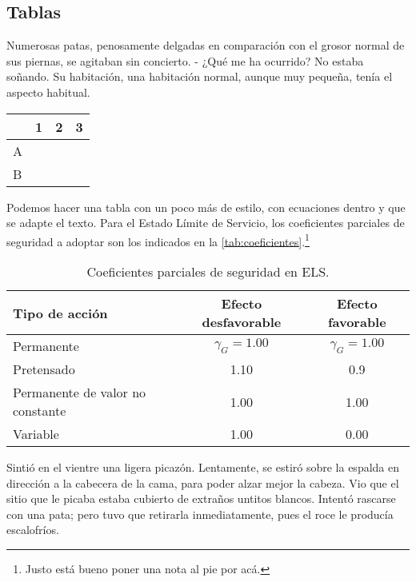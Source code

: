 \subsection{Tablas}
Numerosas patas, penosamente delgadas en comparación con el grosor normal de sus piernas, se agitaban sin concierto. - ¿Qué me ha ocurrido? No estaba soñando. Su habitación, una habitación normal, aunque muy pequeña, tenía el aspecto habitual. 

\begin{center}
	\begin{tabular}{|l|c|c|c|}
		\hline   & 1 & 2 & 3 \\ 
		\hline A &  &  &  \\ 
		\hline B &  &  &  \\ 
		\hline 
	\end{tabular} 
\end{center}

Podemos hacer una tabla con un poco más de estilo, con ecuaciones dentro
y que se adapte el texto.
Para el Estado Límite de Servicio, los coeficientes parciales de seguridad a adoptar son los indicados en la \autoref{tab:coeficientes}.\footnote{\textcolor{grayblack}{Justo está bueno poner una nota al pie por acá.}}

\begin{table}[h]
	\centering
	\caption{Coeficientes parciales de seguridad en ELS.}
	{\color{grayblack}
	\begin{tabular}{p{4cm}cc}
		\toprule
		\textbf{Tipo de acción}    & \textbf{Efecto desfavorable} & \textbf{Efecto favorable}\\
		\midrule
		Permanente & $\gamma_G=1.00$ & $\gamma_G=1.00$ \\
		Pretensado & 1.10 & 0.9 \\
		Permanente de valor no constante  & 1.00 & 1.00 \\
		Variable & 1.00 & 0.00 \\
		\bottomrule
	\end{tabular}}
	\label{tab:coeficientes}
\end{table}%

Sintió en el vientre una ligera picazón. Lentamente, se estiró sobre la espalda en dirección a la cabecera de la cama, para poder alzar mejor la cabeza. Vio que el sitio que le picaba estaba cubierto de extraños untitos blancos. Intentó rascarse con una pata; pero tuvo que retirarla inmediatamente, pues el roce le producía escalofríos.

